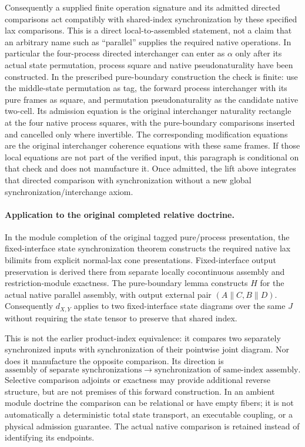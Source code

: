 \documentclass{article}
\begin{document}
Consequently a supplied finite operation signature and its admitted directed comparisons act compatibly with shared-index synchronization by these specified lax comparisons. This is a direct local-to-assembled statement, not a claim that an arbitrary name such as ``parallel'' supplies the required native operations. In particular the four-process directed interchanger can enter as $\alpha$ only after its actual state permutation, process square and native pseudonaturality have been constructed. In the prescribed pure-boundary construction the check is finite: use the middle-state permutation as tag, the forward process interchanger with its pure frames as square, and permutation pseudonaturality as the candidate native two-cell. Its admission equation is the original interchanger naturality rectangle at the four native process squares, with the pure-boundary comparisons inserted and cancelled only where invertible. The corresponding modification equations are the original interchanger coherence equations with these same frames. If those local equations are not part of the verified input, this paragraph is conditional on that check and does not manufacture it. Once admitted, the lift above integrates that directed comparison with synchronization without a new global synchronization/interchange axiom.

\paragraph{Application to the original completed relative doctrine.} In the module completion of the original tagged pure/process presentation, the fixed-interface state synchronization theorem constructs the required native lax bilimits from explicit normal-lax cone presentations. Fixed-interface output preservation is derived there from separate locally cocontinuous assembly and restriction-module exactness. The pure-boundary lemma constructs $H$ for the actual native parallel assembly, with output external pair $(A\parallel C,B\parallel D)$. Consequently $d_{X,Y}$ applies to two fixed-interface state diagrams over the same $J$ without requiring the state tensor to preserve that shared index.

This is not the earlier product-index equivalence: it compares two separately synchronized inputs with synchronization of their pointwise joint diagram. Nor does it manufacture the opposite comparison. Its direction is
\[
 \text{assembly of separate synchronizations}
 \longrightarrow\text{synchronization of same-index assembly}.
\]
Selective comparison adjoints or exactness may provide additional reverse structure, but are not premises of this forward construction. In an ambient module doctrine the comparison can be relational or have empty fibers; it is not automatically a deterministic total state transport, an executable coupling, or a physical admission guarantee. The actual native comparison is retained instead of identifying its endpoints.
\end{document}
